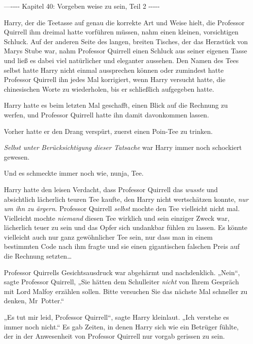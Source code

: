 

\hypertarget{vorgeben-weise-zu-sein-teil-2}{%

—\/-\/-\/-\/- Kapitel 40: Vorgeben weise zu sein, Teil 2 -\/-\/-\/-\/-

Harry, der die Teetasse auf genau die korrekte Art und Weise hielt, die Professor Quirrell ihm dreimal hatte vorführen müssen, nahm einen kleinen, vorsichtigen Schluck. Auf der anderen Seite des langen, breiten Tisches, der das Herzstück von Marys Stube war, nahm Professor Quirrell einen Schluck aus seiner eigenen Tasse und ließ es dabei viel natürlicher und eleganter aussehen. Den Namen des Tees selbst hatte Harry nicht einmal aussprechen können oder zumindest hatte Professor Quirrell ihn jedes Mal korrigiert, wenn Harry versucht hatte, die chinesischen Worte zu wiederholen, bis er schließlich aufgegeben hatte.

Harry hatte es beim letzten Mal geschafft, einen Blick auf die Rechnung zu werfen, und Professor Quirrell hatte ihn damit davonkommen lassen.

Vorher hatte er den Drang verspürt, zuerst einen Poin-Tee zu trinken.

\emph{Selbst unter Berücksichtigung dieser Tatsache} war Harry immer noch schockiert gewesen.

Und es schmeckte immer noch wie, nunja, Tee.

Harry hatte den leisen Verdacht, dass Professor Quirrell das \emph{wusste} und absichtlich lächerlich teuren Tee kaufte, den Harry nicht wertschätzen konnte, \emph{nur um ihn zu ärgern}. Professor Quirrell \emph{selbst} mochte den Tee vielleicht nicht mal. Vielleicht mochte \emph{niemand} diesen Tee wirklich und sein einziger Zweck war, lächerlich teuer zu sein und das Opfer sich undankbar fühlen zu lassen. Es könnte vielleicht auch nur ganz gewöhnlicher Tee sein, nur dass man in einem bestimmten Code nach ihm fragte und sie einen gigantischen falschen Preis auf die Rechnung setzten…

Professor Quirrells Gesichtsausdruck war abgehärmt und nachdenklich. „Nein“, sagte Professor Quirrell, „Sie hätten dem Schulleiter \emph{nicht} von Ihrem Gespräch mit Lord Malfoy erzählen sollen. Bitte versuchen Sie das nächste Mal schneller zu denken, Mr~Potter.“

„Es tut mir leid, Professor Quirrell“, sagte Harry kleinlaut. „Ich verstehe es immer noch nicht.“ Es gab Zeiten, in denen Harry sich wie ein Betrüger fühlte, der in der Anwesenheit von Professor Quirrell nur vorgab gerissen zu sein.

}
